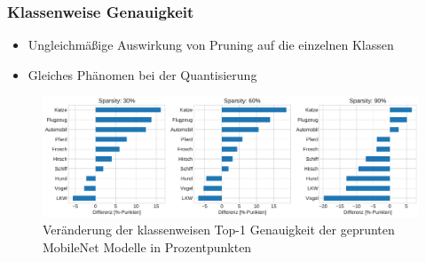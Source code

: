 \documentclass{beamer}
\begin{document}
\begin{frame}
\frametitle{Klassenweise Genauigkeit}

\begin{itemize}
	\item Ungleichmäßige Auswirkung von Pruning auf die einzelnen Klassen \cite{hooker_what_2020}
	\item Gleiches Phänomen bei der Quantisierung
\end{itemize}

\begin{figure}
\includegraphics[width=\textwidth]{img/classwise_acc_change_pruning_mobilenet.pdf}
\caption{Veränderung der klassenweisen Top-1 Genauigkeit der geprunten MobileNet Modelle in Prozentpunkten}
\end{figure}

\end{frame}


\end{document}
